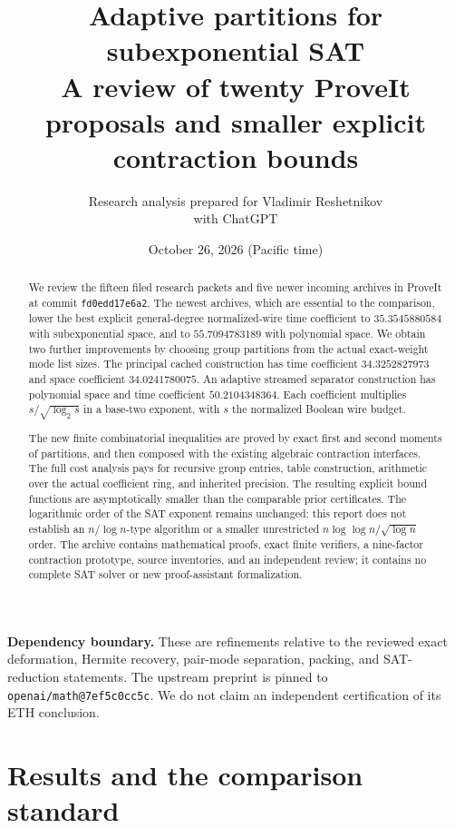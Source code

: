 \documentclass[11pt,letterpaper]{article}
\title{Adaptive partitions for subexponential SAT\\[5pt]
\large A review of twenty ProveIt proposals and smaller explicit contraction bounds}
\author{Research analysis prepared for Vladimir Reshetnikov\\\small with ChatGPT}
\date{October 26, 2026 (Pacific time)}
\theoremstyle{remark}\newtheorem{remark}[theorem]{Remark}
\begin{document}
\maketitle
\begin{abstract}
We review the fifteen filed research packets and five newer incoming archives
in ProveIt at commit \texttt{fd0edd17e6a2}. The newest archives, which are
essential to the comparison, lower the best explicit general-degree
normalized-wire time coefficient to $35.3545880584$ with subexponential
space, and to $55.7094783189$ with polynomial space. We obtain two further
improvements by choosing group partitions from the actual exact-weight mode
list sizes. The principal cached construction has time coefficient
$34.3252827973$ and space coefficient $34.0241780075$. An adaptive streamed
separator construction has polynomial space and time coefficient
$50.2104348364$. Each coefficient multiplies $s/\sqrt{\log_2s}$ in a
base-two exponent, with $s$ the normalized Boolean wire budget.

The new finite combinatorial inequalities are proved by exact first and
second moments of partitions, and then composed with the existing algebraic
contraction interfaces. The full cost analysis pays for recursive group
entries, table construction, arithmetic over the actual coefficient ring,
and inherited precision. The resulting explicit bound functions are
asymptotically smaller than the comparable prior certificates. The
logarithmic order of the SAT exponent remains unchanged: this report does
not establish an $n/\log n$-type algorithm or a smaller unrestricted
$n\log\log n/\sqrt{\log n}$ order. The archive contains mathematical
proofs, exact finite verifiers, a nine-factor contraction prototype,
source inventories, and an independent review; it contains no complete
SAT solver or new proof-assistant formalization.
\end{abstract}

\noindent\textbf{Dependency boundary.} These are refinements relative to the
reviewed exact deformation, Hermite recovery, pair-mode separation, packing,
and SAT-reduction statements. The upstream preprint is pinned to
\texttt{openai/math@7ef5c0cc5c}. We do not claim an independent certification
of its ETH conclusion.
\newpage
\tableofcontents
\newpage

\section{Results and the comparison standard}
\label{sec:result}
\end{document}
